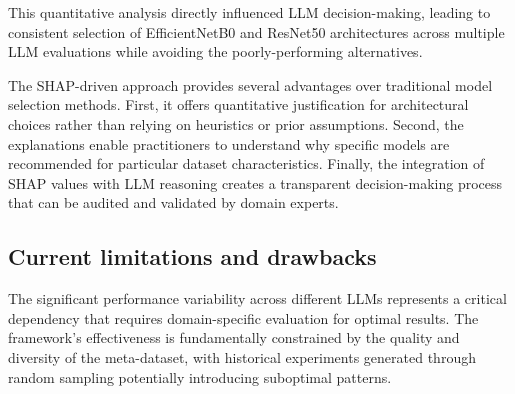 \documentclass{article}
\begin{document}

This quantitative analysis directly influenced LLM decision-making, leading to consistent selection of EfficientNetB0 and ResNet50 architectures across multiple LLM evaluations while avoiding the poorly-performing alternatives.

The SHAP-driven approach provides several advantages over traditional model selection methods. First, it offers quantitative justification for architectural choices rather than relying on heuristics or prior assumptions. Second, the explanations enable practitioners to understand why specific models are recommended for particular dataset characteristics. Finally, the integration of SHAP values with LLM reasoning creates a transparent decision-making process that can be audited and validated by domain experts.

\subsection{Current limitations and drawbacks}

The significant performance variability across different LLMs represents a critical dependency that requires domain-specific evaluation for optimal results. The framework's effectiveness is fundamentally constrained by the quality and diversity of the meta-dataset, with historical experiments generated through random sampling potentially introducing suboptimal patterns.
\end{document}
